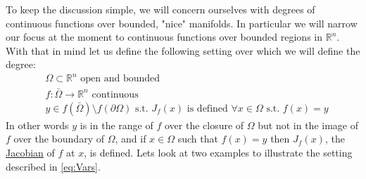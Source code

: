 \documentclass[11pt]{article}
\theoremstyle{plain}
\theoremstyle{definition}
\theoremstyle{remark}
\begin{document}
\medskip
To keep the discussion simple, %
we will concern ourselves with degrees of continuous functions over bounded, "nice" manifolds. In particular we will narrow our focus at the moment to continuous functions over bounded regions in $\mathbb{R}^n$. With that in mind let us define the following setting over which we will define the degree: 
\begin{subequations}\label{eq:Vars}
\begin{align}
& \Omega\subset\mathbb{R}^n \text{ open and bounded }\\
& f:\bar{\Omega}\rightarrow \mathbb{R}^n \text{ continuous } \\
& y\in f\left(\bar{\Omega}\right)\setminus f\left(\partial\Omega\right) \text{ s.t. $J_f(x)$ is defined $\forall x\in\Omega$ s.t. $f(x)=y$}
\end{align}
\end{subequations}
In other words $y$ is in the range of $f$ over the closure of $\Omega$ but not in the image of $f$ over the boundary of $\Omega$, and if $x\in\Omega$ such that $f(x)=y$ then $J_f(x)$, the \href{https://en.wikipedia.org/wiki/Jacobian_matrix_and_determinant}{Jacobian} of $f$ at $x$, is defined. Lets look at two examples to illustrate the setting described in \eqref{eq:Vars}. 
\end{document}
